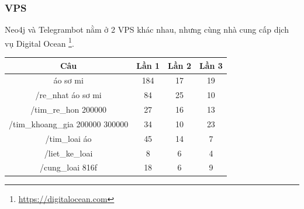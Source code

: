 \subsubsection{VPS}
Neo4j và Telegrambot nằm ở 2 VPS khác nhau, nhưng cùng nhà cung cấp dịch vụ Digital Ocean \footnote{\url{https://digitalocean.com}}. 

\begin{center}
 \begin{tabular}{||c c c c||} 
 \hline
Câu & Lần 1 & Lần 2 & Lần 3 \\ [0.5ex] 
 \hline
 \hline
áo sơ mi  & 184 & 17 & 19 \\ 
 \hline
/re\_nhat áo sơ mi & 84 & 25 & 10 \\
 \hline
 /tim\_re\_hon 200000 & 27 & 16 & 13 \\
 \hline
 /tim\_khoang\_gia 200000 300000 & 34 & 10 & 23 \\
 \hline
 /tim\_loai áo & 45 & 14 & 7 \\
 \hline
/liet\_ke\_loai & 8  & 6 & 4 \\
 \hline
  /cung\_loai 816f & 18 & 6  & 9 \\ [1ex] 
 \hline
\end{tabular}
\end{center}












